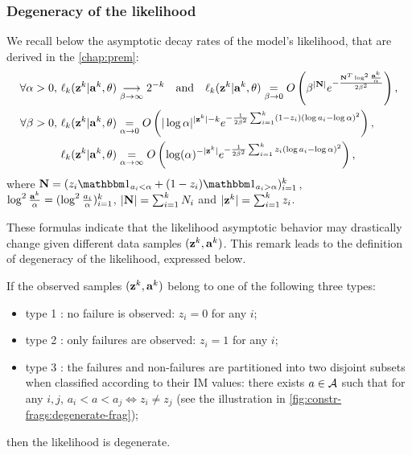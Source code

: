 \subsubsection{Degeneracy of the likelihood}

We recall below the asymptotic decay rates of the model's likelihood, that are derived in the \cref{chap:prem}:
\begin{align}
    \forall\alpha>0,\, \ell_k(\mathbf{z}^k|\mathbf{a}^k,\theta) &\overset{\ }{\underset{\beta\rightarrow\infty}{\longrightarrow}}2^{-k}\quad\text{and}\quad
        \ell_k(\mathbf{z}^k|\mathbf{a}^k,\theta) \overset{}{\underset{\beta\rightarrow0}{=}}O\left(\beta^{|\mathbf{N}|}e^{-\frac{\mathbf{N}^T\log^2\frac{\mathbf{a}^k}{\alpha}}{2\beta^2}}\right) ,\\
    \forall\beta>0,\, \ell_k(\mathbf{z}^k|\mathbf{a}^k,\theta)  &\overset{}{\underset{\alpha\rightarrow0}{=}}  O\left(|\log\alpha|^{|\mathbf{z}^k|-k} e^{-\frac{1}{2\beta^2}\sum_{i=1}^k (1-z_i)(\log a_i-\log\alpha)^2} \right),\\
    \ell_k(\mathbf{z}^k|\mathbf{a}^k,\theta) &\overset{}{\underset{\alpha\rightarrow\infty}{=}}  O\left(\log(\alpha)^{-|\mathbf{z}^k|} e^{-\frac{1}{2\beta^2}\sum_{i=1}^k z_i(\log a_i-\log\alpha)^2} \right) ,
\end{align}
where $\mbf N=(z_i\indic_{a_i<\alpha}+(1-z_i)\indic_{a_i>\alpha})_{i=1}^k$, $\log^2\frac{\mathbf{a}^k}{\alpha}=(\log^2\frac{a_i}{\alpha})_{i=1}^k$, 
    $|\mathbf{N}|=\sum_{i=1}^kN_i$ and
    $|\mathbf{z}^k|=\sum_{i=1}^kz_i$. %

%
These formulas indicate that the likelihood asymptotic behavior may drastically change given different data samples $(\mathbf{z}^k,\mathbf{a}^k)$.
This remark leads to the definition of degeneracy of the likelihood, expressed below.


\begin{defi}\label{def:constr-frag:degeneracy}
    If the observed samples $(\mathbf{z}^k,\mathbf{a}^k)$ belong to one of the following three types:
    \begin{itemize}
        \item
        type 1 : no failure is observed: $z_i=0$ for any $i$;
        \item type 2 : only failures are observed: $z_i=1$ for any $i$;
        \item type 3 : the failures and non-failures are partitioned into two disjoint subsets when classified according to their IM values:
        there exists $a\in\mathcal{A}$ such that for any $i,j$, $a_i<a<a_j\Longleftrightarrow z_i\ne z_j$ (see the illustration in \cref{fig:constr-frags:degenerate-frag});
    \end{itemize}
    then the likelihood is degenerate.
\end{defi}


